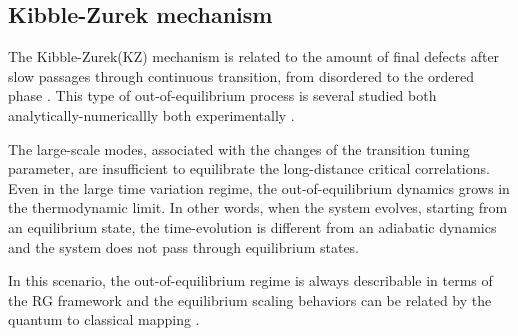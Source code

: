 \subsection{Kibble-Zurek mechanism}

The Kibble-Zurek(KZ) mechanism is related to the amount of final defects after slow
passages through continuous transition, from disordered to the ordered phase 
\cite{kibble1976topology, kibble1980some, zurek1985cosmological, zurek1996cosmological, 
zurek2005dynamics}. This type of out-of-equilibrium process is several studied both
analytically-numericallly \cite{dziarmaga2010dynamics, PSSV-2011-noneqcoll,
chandran2012kibble, rossini2021coherent} both experimentally \cite{weiler2008spontaneous,
ulm2013observation}.

The large-scale modes, associated with the changes of the transition tuning parameter, are
insufficient to equilibrate the long-distance critical correlations. Even in the large
time variation regime, the out-of-equilibrium dynamics grows in the thermodynamic limit.
In other words, when the system evolves, starting from an equilibrium state, the
time-evolution is different from an adiabatic dynamics and the system does not pass 
through equilibrium states.

In this scenario, the out-of-equilibrium regime is always describable in terms of the RG
framework and the equilibrium scaling behaviors can be related by the quantum to classical
mapping \cite{rossini2021coherent, S99}.


